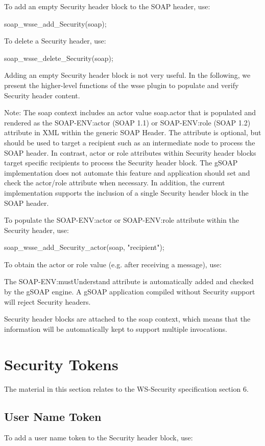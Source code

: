 To add an empty Security header block to the SOAP header, use:


\begin{DoxyCode}
    soap_wsse_add_Security(soap);
\end{DoxyCode}


To delete a Security header, use:


\begin{DoxyCode}
    soap_wsse_delete_Security(soap);
\end{DoxyCode}


Adding an empty Security header block is not very useful. In the following, we present the higher-\/level functions of the wsse plugin to populate and verify Security header content.

Note: The soap context includes an actor value soap.actor that is populated and rendered as the SOAP-\/ENV:actor (SOAP 1.1) or SOAP-\/ENV:role (SOAP 1.2) attribute in XML within the generic SOAP Header. The attribute is optional, but should be used to target a recipient such as an intermediate node to process the SOAP header. In contrast, actor or role attributes within Security header blocks target specific recipients to process the Security header block. The gSOAP implementation does not automate this feature and application should set and check the actor/role attribute when necessary. In addition, the current implementation supports the inclusion of a single Security header block in the SOAP header.

To populate the SOAP-\/ENV:actor or SOAP-\/ENV:role attribute within the Security header, use:


\begin{DoxyCode}
    soap_wsse_add_Security_actor(soap, "recipient");
\end{DoxyCode}


To obtain the actor or role value (e.g. after receiving a message), use:


\begin{DoxyCode}
    _wsse__Security *security = soap_wsse_Security(soap);
    if (security)
    { ... = security->SOAP_ENV__actor; // SOAP 1.1
      ... = security->SOAP_ENV__role;  // SOAP 1.2
\end{DoxyCode}


The SOAP-\/ENV:mustUnderstand attribute is automatically added and checked by the gSOAP engine. A gSOAP application compiled without Security support will reject Security headers.

Security header blocks are attached to the soap context, which means that the information will be automatically kept to support multiple invocations.\hypertarget{wsse_wsse_6}{}\section{Security Tokens}\label{wsse_wsse_6}
The material in this section relates to the WS-\/Security specification section 6.\hypertarget{wsse_wsse_6_2}{}\subsection{User Name Token}\label{wsse_wsse_6_2}
To add a user name token to the Security header block, use:


